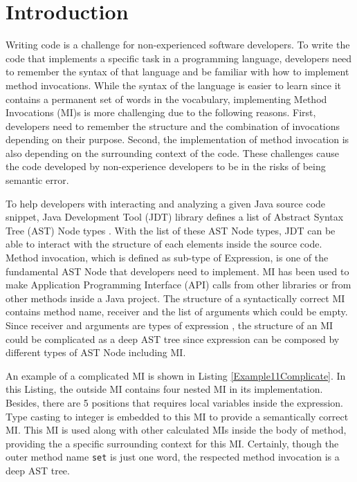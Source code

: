 \section{Introduction}
Writing code is a challenge for non-experienced software developers. To write the code that implements a specific task in a programming language, developers need to remember the syntax of that language and be familiar with how to implement method invocations. While the syntax of the language is easier to learn since it contains a permanent set of words in the vocabulary, implementing Method Invocations (MI)s is more challenging due to the following reasons. First, developers need to remember the structure and the combination of invocations depending on their purpose. Second, the implementation of method invocation is also depending on the surrounding context of the code. These challenges cause the code developed by non-experience developers to be in the risks of being semantic error.

To help developers with interacting and analyzing a given Java source code snippet, Java Development Tool (JDT) library defines a list of Abstract Syntax Tree (AST) Node types \cite{id:ASTDocumentation}. With the list of these AST Node types, JDT can be able to interact with the structure of each elements inside the source code. Method invocation, which is defined as sub-type of Expression, is one of the fundamental AST Node that developers need to implement. MI has been used to make Application Programming Interface (API) calls from other libraries or from other methods inside a Java project.  The structure of a syntactically correct MI contains method name, receiver and the list of arguments which could be empty. Since receiver and arguments are types of expression \cite{id:ASTDocumentation}, the structure of an MI could be complicated as a deep AST tree since expression can be composed by different types of AST Node including MI. 


An example of a complicated MI is shown in Listing \ref{Example11Complicate}. In this Listing, the outside MI contains four nested MI in its implementation. Besides, there are 5 positions that requires local variables inside the expression. Type casting to integer is embedded to this MI to provide a semantically correct MI. This MI is used along with other calculated MIs inside the body of method, providing the a specific surrounding context for this MI. Certainly, though the outer method name \texttt{set} is just one word, the respected method invocation is a deep AST tree.

